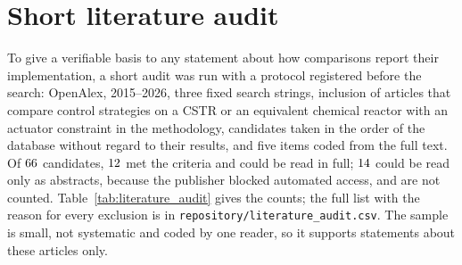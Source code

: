 \documentclass[11pt]{article}
\begin{document}






\section{Short literature audit}\label{supp:audit}
To give a verifiable basis to any statement about how comparisons report their implementation, a short audit was run with a protocol registered before the search: OpenAlex, 2015--2026, three fixed search strings, inclusion of articles that compare control strategies on a CSTR or an equivalent chemical reactor with an actuator constraint in the methodology, candidates taken in the order of the database without regard to their results, and five items coded from the full text. Of $66$ candidates, $12$ met the criteria and could be read in full; $14$ could be read only as abstracts, because the publisher blocked automated access, and are not counted. Table~\ref{tab:literature_audit} gives the counts; the full list with the reason for every exclusion is in \texttt{repository/literature\_audit.csv}. The sample is small, not systematic and coded by one reader, so it supports statements about these articles only.





\end{document}
